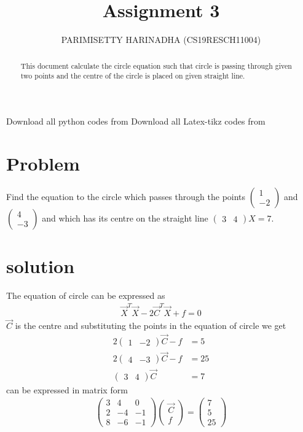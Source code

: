 \documentclass[journal,12pt,twocolumn]{IEEEtran}
\title{Assignment 3}
\author{PARIMISETTY HARINADHA (CS19RESCH11004)}
\newcommand{\myvec}[1]{\ensuremath{\begin{pmatrix}#1\end{pmatrix}}}
\begin{document}
\maketitle
\newpage
\begin{abstract}
This document calculate the circle equation such that circle is passing through given two points and the centre of the circle is placed on given straight line.
\end{abstract}
Download all python codes from 
Download all Latex-tikz codes from 
\section{Problem}
Find the equation to the circle which passes through the points $\myvec{ 1 \\ -2 }$ and $\myvec{ 4 \\ -3 }$ and which has its centre on the straight line $\myvec{ 3 & 4 }X = 7$.
\section{solution}
The equation of circle can be expressed as
\begin{align}
    \vec{X}^T\vec{X}-2\vec{C}^T\vec{X}+f = 0
\end{align}
$\vec{C}$ is the centre  and substituting the points in the equation of circle we get
\begin{align}
2\myvec{1 & -2}\vec{C}-f &= 5\\
2\myvec{4 & -3}\vec{C}-f &= 25\\
\myvec{3 & 4}\vec{C} &= 7
\end{align}
can be expressed in matrix form
\begin{align}
\myvec{3 & 4 & 0 \\
2 & -4 & -1 \\
8 & -6 & -1}
\myvec{\vec{C}\\f} = \myvec{ 7 \\ 5 \\ 25}
\end{align}
\end{document}

